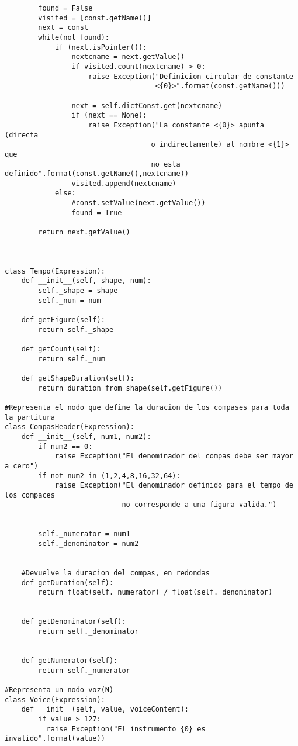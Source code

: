 \begin{verbatim}
        found = False
        visited = [const.getName()]
        next = const
        while(not found):
            if (next.isPointer()):
                nextcname = next.getValue()
                if visited.count(nextcname) > 0:
                    raise Exception("Definicion circular de constante
                                    <{0}>".format(const.getName()))

                next = self.dictConst.get(nextcname)
                if (next == None):
                    raise Exception("La constante <{0}> apunta (directa
                                   o indirectamente) al nombre <{1}> que 
                                   no esta definido".format(const.getName(),nextcname))
                visited.append(nextcname)
            else:
                #const.setValue(next.getValue())
                found = True

        return next.getValue()



class Tempo(Expression):
    def __init__(self, shape, num):
        self._shape = shape
        self._num = num

    def getFigure(self):
        return self._shape

    def getCount(self):
        return self._num

    def getShapeDuration(self):
        return duration_from_shape(self.getFigure())

#Representa el nodo que define la duracion de los compases para toda la partitura
class CompasHeader(Expression):
    def __init__(self, num1, num2):
        if num2 == 0:
            raise Exception("El denominador del compas debe ser mayor a cero")
        if not num2 in (1,2,4,8,16,32,64):
            raise Exception("El denominador definido para el tempo de los compaces
                            no corresponde a una figura valida.")


        self._numerator = num1
        self._denominator = num2


    #Devuelve la duracion del compas, en redondas
    def getDuration(self):
        return float(self._numerator) / float(self._denominator)


    def getDenominator(self):
        return self._denominator


    def getNumerator(self):
        return self._numerator

#Representa un nodo voz(N)
class Voice(Expression):
    def __init__(self, value, voiceContent):
        if value > 127:
          raise Exception("El instrumento {0} es invalido".format(value))


\end{verbatim}
